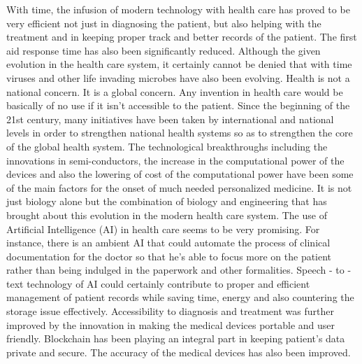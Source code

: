 \documentclass[12pt]{article}
\begin{document}
\begin{large}

\raggedright
With time, the infusion of modern technology with health care has proved to be very efficient not just in diagnosing the patient, but also helping with the treatment and in keeping proper track and better records of the patient. The first aid response time has also been significantly reduced. Although the given evolution in the health care system, it certainly cannot be denied that with time viruses and other life invading microbes have also been evolving.
\linebreak
\linebreak
Health is not a national concern. It is a global concern. Any invention in health care would be basically of no use if it isn't accessible to the patient. Since the beginning of the 21st century, many initiatives have been taken by international and national levels in order to strengthen national health systems so as to strengthen the core of the global health system. 
\linebreak
\linebreak
The technological breakthroughs including the innovations in semi-conductors, the increase in the computational power of the devices and also the lowering of cost of the computational power have been some of the main factors for the onset of much needed personalized medicine. It is not just biology alone but the combination of biology and engineering that has brought about this evolution in the modern health care system.
\linebreak
\linebreak
The use of Artificial Intelligence (AI) in health care seems to be very promising. For instance, there is an ambient AI that could automate the process of clinical documentation for the doctor so that he's able to focus more on the patient rather than being indulged in the paperwork and other formalities. Speech - to - text technology of AI could certainly contribute to proper and efficient management of patient records while saving time, energy and also countering the storage issue effectively.
\linebreak
\linebreak
Accessibility to diagnosis and treatment was further improved by the innovation in making the medical devices portable and user friendly. Blockchain has been playing an integral part in keeping patient's data private and secure. The accuracy of the medical devices has also been improved.
\linebreak

\end{large}
\end{document}

